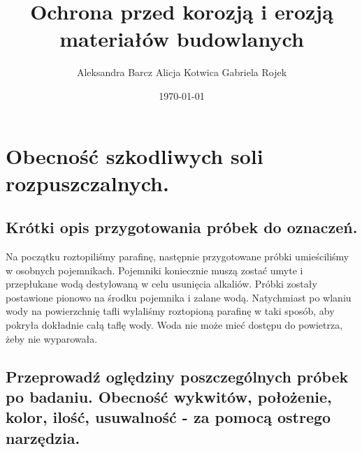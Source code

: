 


\title{Ochrona przed korozją i erozją materiałów budowlanych}
\author{Aleksandra Barcz \newline Alicja Kotwica \newline Gabriela Rojek}
\date{\today}




\maketitle
{
\setcounter{tocdepth}{3}
\newpage
{} 
}

\section{Obecność szkodliwych soli rozpuszczalnych.}

\subsection{Krótki opis przygotowania próbek do oznaczeń.}

Na początku roztopiliśmy parafinę, następnie przygotowane próbki umieściliśmy w osobnych pojemnikach. Pojemniki koniecznie muszą zostać umyte i przepłukane wodą destylowaną w celu usunięcia alkaliów. Próbki zostały postawione pionowo na środku pojemnika i zalane wodą. Natychmiast po wlaniu wody na powierzchnię tafli wylaliśmy roztopioną parafinę w taki sposób, aby pokryła dokładnie całą taflę wody. Woda nie może mieć dostępu do powietrza, żeby nie wyparowała.

\subsection{Przeprowadź oględziny poszczególnych próbek po badaniu. Obecność wykwitów, położenie, kolor, ilość, usuwalność - za pomocą ostrego narzędzia.}

